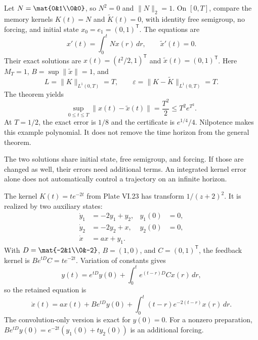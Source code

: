 Let $N=\mat{0&1\\0&0}$, so $N^2=0$ and $\|N\|_2=1$. On $[0,T]$, compare the memory kernels $K(t)=N$ and $\widetilde K(t)=0$, with identity free semigroup, no forcing, and initial state $x_0=e_1=(0,1)^{\mathsf T}$. The equations are
\[
x'(t)=\int_0^t N x(r)\,dr,\qquad
\widetilde x'(t)=0.
\]
Their exact solutions are $x(t)=(t^2/2,1)^{\mathsf T}$ and $\widetilde x(t)=(0,1)^{\mathsf T}$.
Here $M_T=1$, $B=\sup\|\widetilde x\|=1$, and
\[
L=\|K\|_{L^1(0,T)}=T,\qquad
\varepsilon=\|K-\widetilde K\|_{L^1(0,T)}=T.
\]
The theorem yields
\[
\sup_{0\le t\le T}\|x(t)-\widetilde x(t)\|
=\frac{T^2}{2}\le T^2e^{T^2}.
\]
At $T=1/2$, the exact error is $1/8$ and the certificate is $e^{1/4}/4$. Nilpotence makes this example polynomial. It does not remove the time horizon from the general theorem.

The two solutions share initial state, free semigroup, and forcing. If those are changed as well, their errors need additional terms. An integrated kernel error alone does not automatically control a trajectory on an infinite horizon.

The kernel $K(t)=te^{-2t}$ from Plate VI.23 has transform $1/(z+2)^2$. It is realized by two auxiliary states:
\[
\begin{aligned}
\dot y_1&=-2y_1+y_2,& y_1(0)&=0,\\
\dot y_2&=-2y_2+x,& y_2(0)&=0,\\
\dot x&=a x+y_1.&
\end{aligned}
\]
With $D=\mat{-2&1\\0&-2}$, $B=(1,0)$, and $C=(0,1)^{\mathsf T}$, the feedback kernel is $Be^{tD}C=te^{-2t}$.
Variation of constants gives
\[
y(t)=e^{tD}y(0)+\int_0^t e^{(t-r)D}Cx(r)\,dr,
\]
so the retained equation is
\[
\dot x(t)=a x(t)+Be^{tD}y(0)
+\int_0^t (t-r)e^{-2(t-r)}x(r)\,dr.
\]
The convolution-only version is exact for $y(0)=0$. For a nonzero preparation, $Be^{tD}y(0)=e^{-2t}(y_1(0)+t y_2(0))$ is an additional forcing.

